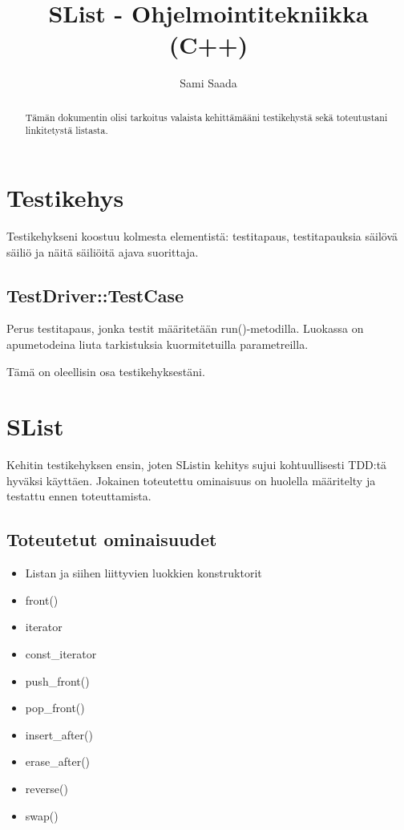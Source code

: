 \documentclass{article}
\begin{document}
\title{SList - Ohjelmointitekniikka (C++)}
\author{Sami Saada}

\maketitle

\begin{abstract}
Tämän dokumentin olisi tarkoitus valaista kehittämääni testikehystä sekä
toteutustani linkitetystä listasta.
\end{abstract}

\section{Testikehys}

Testikehykseni koostuu kolmesta elementistä: testitapaus, testitapauksia säilövä
säiliö ja näitä säiliöitä ajava suorittaja.

\subsection{TestDriver::TestCase}

Perus testitapaus, jonka testit määritetään run()-metodilla. Luokassa on
apumetodeina liuta tarkistuksia kuormitetuilla parametreilla.

Tämä on oleellisin osa testikehyksestäni.

\section{SList}

Kehitin testikehyksen ensin, joten SListin kehitys sujui kohtuullisesti TDD:tä
hyväksi käyttäen. Jokainen toteutettu ominaisuus on huolella määritelty ja
testattu ennen toteuttamista.

\subsection{Toteutetut ominaisuudet}

\begin{itemize}
    \item Listan ja siihen liittyvien luokkien konstruktorit
    \item front()
    \item iterator
    \item const\_iterator
    \item push\_front()
    \item pop\_front()
    \item insert\_after()
    \item erase\_after()
    \item reverse()
    \item swap()
\end{itemize}
\end{document}
